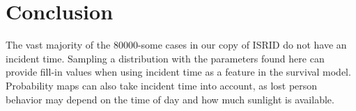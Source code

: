 \documentclass[12pt]{article}
\begin{document}
    

  \section{Conclusion}
    The vast majority of the 80000-some cases in our copy of ISRID do not have
    an incident time. Sampling a distribution with the parameters found here
    can provide fill-in values when using incident time as a feature in the
    survival model. Probability maps can also take incident time into account,
    as lost person behavior may depend on the time of day and how much sunlight
    is available.

  
  
\end{document}
